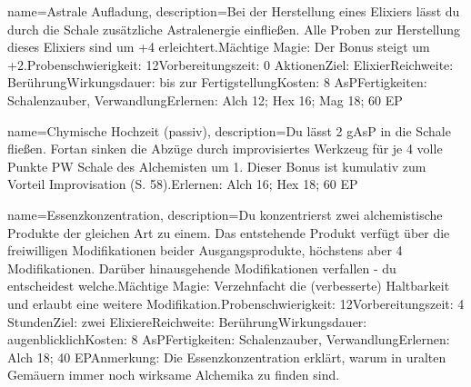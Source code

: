 {
    name={Astrale Aufladung},
    description={Bei der Herstellung eines Elixiers lässt du durch die Schale zusätzliche Astralenergie einfließen. Alle Proben zur Herstellung dieses Elixiers sind um +4 erleichtert.\newline Mächtige Magie: Der Bonus steigt um +2.\newline Probenschwierigkeit: 12\newline Vorbereitungszeit: 0 Aktionen\newline Ziel: Elixier\newline Reichweite: Berührung\newline Wirkungsdauer: bis zur Fertigstellung\newline Kosten: 8 AsP\newline Fertigkeiten: Schalenzauber, Verwandlung\newline Erlernen: Alch 12; Hex 16; Mag 18; 60 EP}
}


{
    name={Chymische Hochzeit (passiv)},
    description={Du lässt 2 gAsP in die Schale fließen. Fortan sinken die Abzüge durch improvisiertes Werkzeug für je 4 volle Punkte PW Schale des Alchemisten um 1. Dieser Bonus ist kumulativ zum Vorteil Improvisation (S. 58).\newline Erlernen: Alch 16; Hex 18; 60 EP}
}


{
    name={Essenzkonzentration},
    description={Du konzentrierst zwei alchemistische Produkte der gleichen Art zu einem. Das entstehende Produkt verfügt über die freiwilligen Modifikationen beider Ausgangsprodukte, höchstens aber 4 Modifikationen. Darüber hinausgehende Modifikationen verfallen - du entscheidest welche.\newline Mächtige Magie: Verzehnfacht die (verbesserte) Haltbarkeit und erlaubt eine weitere Modifikation.\newline Probenschwierigkeit: 12\newline Vorbereitungszeit: 4 Stunden\newline Ziel: zwei Elixiere\newline Reichweite: Berührung\newline Wirkungsdauer: augenblicklich\newline Kosten: 8 AsP\newline Fertigkeiten: Schalenzauber, Verwandlung\newline Erlernen: Alch 18; 40 EP\newline Anmerkung: Die Essenzkonzentration erklärt, warum in uralten Gemäuern immer noch wirksame Alchemika zu finden sind.}
}


